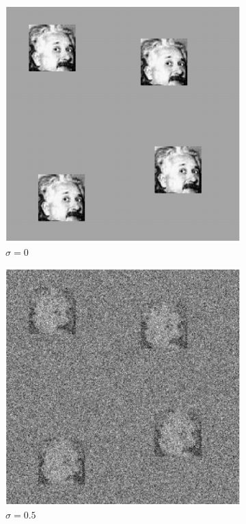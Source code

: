 \documentclass[12pt]{article}
\newcommand{\1}{\mathbf{1}}
\theoremstyle{plain}
\theoremstyle{definition}
\theoremstyle{remark}
\theoremstyle{plain}
\theoremstyle{remark}
\theoremstyle{plain}
\theoremstyle{plain}
\theoremstyle{plain}
\numberwithin{equation}{section}
\begin{document}
\begin{figure}[t]
	\centering
	\begin{subfigure}[h]{0.33\linewidth}
		\centering
		\includegraphics[width=.8\linewidth]{micrograph_Einstein_example_clean}
		\caption{$\sigma = 0$}
	\end{subfigure}%
	\begin{subfigure}[h]{0.33\linewidth}
		\centering
		\includegraphics[width=.8\linewidth]{micrograph_Einstein_example_s05}
		\caption{$\sigma = 0.5$}
	\end{subfigure}
	\begin{subfigure}[h]{0.33\linewidth}

\end{subfigure}
\end{figure}
\end{document}
